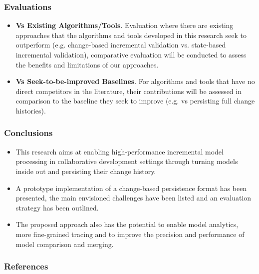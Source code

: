 \documentclass{beamer}
\begin{document}
\begin{frame}
\frametitle{Evaluations}
\begin{itemize}
\item \textbf{Vs Existing Algorithms/Tools}. Evaluation where there are existing approaches that the algorithms and tools developed in this research seek to outperform (e.g. change-based incremental validation vs. state-based incremental validation), comparative evaluation will be conducted to assess the benefits and limitations of our approaches. 
\item \textbf{Vs Seek-to-be-improved Baselines}. For algorithms and tools that have no direct competitors in the literature, their contributions will be assessed in comparison to the baseline they seek to improve (e.g. vs persisting full change histories).
\end{itemize}
\end{frame}

\begin{frame}
\frametitle{Conclusions}
\begin{itemize}
\item This research aims at enabling high-performance incremental model processing in collaborative development settings through turning models inside out and persisting their change history.
\item A prototype implementation of a change-based persistence format has been presented, the main envisioned challenges have been listed and an evaluation strategy has been outlined.
\item The proposed approach also has the potential to enable model analytics, more fine-grained tracing and to improve the precision and performance of model comparison and merging. 
\end{itemize}
\end{frame}

\begin{frame}
\frametitle{References}
\scriptsize


\end{frame}
\end{document}
